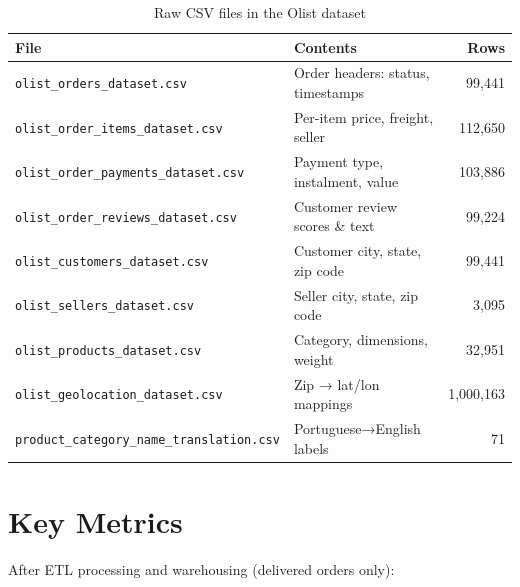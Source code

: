 \documentclass[12pt,a4paper]{report}
\begin{document}
\begin{table}[H]
  \centering
  \caption{Raw CSV files in the Olist dataset}
  \label{tab:raw-files}
  \renewcommand{\arraystretch}{1.3}
  \begin{tabularx}{\textwidth}{lXr}
    \toprule
    \textbf{File} & \textbf{Contents} & \textbf{Rows} \\
    \midrule
    \texttt{olist\_orders\_dataset.csv}         & Order headers: status, timestamps & 99,441 \\
    \texttt{olist\_order\_items\_dataset.csv}   & Per-item price, freight, seller & 112,650 \\
    \texttt{olist\_order\_payments\_dataset.csv}& Payment type, instalment, value & 103,886 \\
    \texttt{olist\_order\_reviews\_dataset.csv} & Customer review scores \& text  & 99,224 \\
    \texttt{olist\_customers\_dataset.csv}      & Customer city, state, zip code  & 99,441 \\
    \texttt{olist\_sellers\_dataset.csv}        & Seller city, state, zip code    & 3,095 \\
    \texttt{olist\_products\_dataset.csv}       & Category, dimensions, weight    & 32,951 \\
    \texttt{olist\_geolocation\_dataset.csv}    & Zip → lat/lon mappings          & 1,000,163 \\
    \texttt{product\_category\_name\_translation.csv} & Portuguese→English labels & 71 \\
    \bottomrule
  \end{tabularx}
\end{table}

\section{Key Metrics}

After ETL processing and warehousing (delivered orders only):
\end{document}
